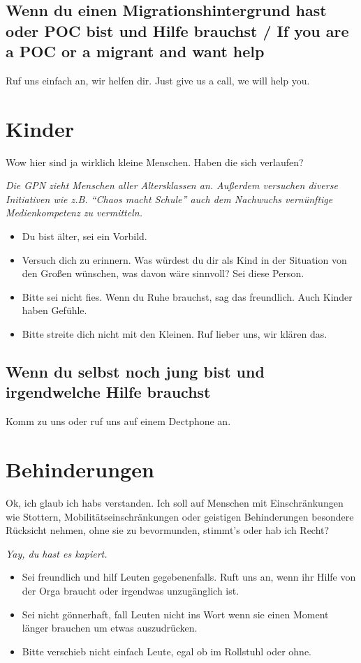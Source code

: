 \documentclass[10pt,foldmark]{leaflet}
\newcommand\dos{\item[$+$]}
\newcommand\donts{\item[$-$]}
\begin{document}
\subsection{Wenn du einen Migrationshintergrund hast oder POC bist und Hilfe brauchst / If you are a POC or a migrant and want help}
Ruf uns einfach an, wir helfen dir. Just give us a call, we will help
you.


\section{Kinder}
\label{sec-6}
 Wow hier sind ja wirklich kleine Menschen. Haben die sich verlaufen?

 \emph{Die GPN zieht Menschen aller Altersklassen an. Außerdem
  versuchen diverse Initiativen wie z.B. ``Chaos macht Schule'' auch
  dem Nachwuchs vernünftige Medienkompetenz zu vermitteln.}


\label{sec-6-1}
\begin{itemize}
\dos Du bist älter, sei ein Vorbild.
\dos Versuch dich zu erinnern. Was würdest du dir als Kind in der
  Situation von den Großen wünschen, was davon wäre sinnvoll? Sei
  diese Person.
\donts Bitte sei nicht fies. Wenn du Ruhe brauchst, sag das
  freundlich. Auch Kinder haben Gefühle.
\donts Bitte streite dich nicht mit den Kleinen. Ruf lieber uns, wir klären
das.
\end{itemize}
\subsection{Wenn du selbst noch jung bist und irgendwelche Hilfe brauchst}
Komm zu uns oder ruf uns auf einem Dectphone an. 


\section{Behinderungen}
Ok, ich glaub ich habs verstanden. Ich soll auf Menschen mit
Einschränkungen wie Stottern, Mobilitätseinschränkungen oder geistigen
Behinderungen besondere Rücksicht nehmen, ohne sie zu bevormunden,
stimmt's oder hab ich Recht?

\emph{Yay, du hast es kapiert.}


\label{sec-7-1}
\begin{itemize}
\dos Sei freundlich und hilf Leuten gegebenenfalls. Ruft uns an, wenn
  ihr Hilfe von der Orga braucht oder irgendwas unzugänglich ist.
\donts Sei nicht gönnerhaft, fall Leuten nicht ins Wort
  wenn sie einen Moment länger brauchen um etwas auszudrücken.
\donts Bitte verschieb nicht einfach Leute, egal ob im Rollstuhl oder
  ohne.
\end{itemize}
\end{document}
